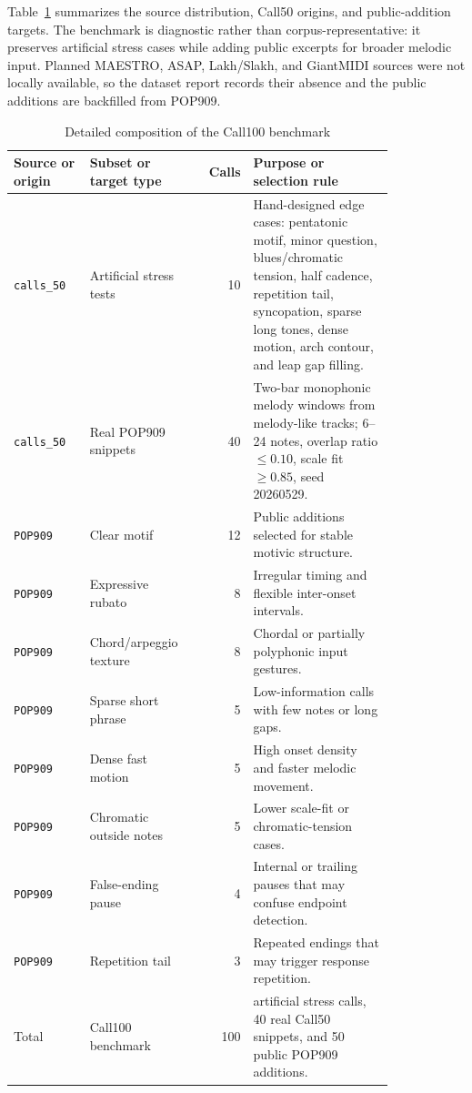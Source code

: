 \documentclass[11pt,a4paper]{article}
\begin{document}
Table~\ref{tab:call100-dataset} summarizes the source distribution, Call50 origins, and public-addition targets. The benchmark is diagnostic rather than corpus-representative: it preserves artificial stress cases while adding public excerpts for broader melodic input. Planned MAESTRO, ASAP, Lakh/Slakh, and GiantMIDI sources were not locally available, so the dataset report records their absence and the public additions are backfilled from POP909.

\begin{table}[htbp]
\centering
\caption{Detailed composition of the Call100 benchmark}
\label{tab:call100-dataset}
\small
\begin{tabular}{>{\raggedright\arraybackslash}p{0.20\linewidth}>{\raggedright\arraybackslash}p{0.26\linewidth}r>{\raggedright\arraybackslash}p{0.37\linewidth}}
\toprule
Source or origin & Subset or target type & Calls & Purpose or selection rule \\
\midrule
\texttt{calls\_50} & Artificial stress tests & 10 & Hand-designed edge cases: pentatonic motif, minor question, blues/chromatic tension, half cadence, repetition tail, syncopation, sparse long tones, dense motion, arch contour, and leap gap filling. \\
\texttt{calls\_50} & Real POP909 snippets & 40 & Two-bar monophonic melody windows from melody-like tracks; 6--24 notes, overlap ratio $\leq 0.10$, scale fit $\geq 0.85$, seed 20260529. \\
\midrule
\texttt{POP909} & Clear motif & 12 & Public additions selected for stable motivic structure. \\
\texttt{POP909} & Expressive rubato & 8 & Irregular timing and flexible inter-onset intervals. \\
\texttt{POP909} & Chord/arpeggio texture & 8 & Chordal or partially polyphonic input gestures. \\
\texttt{POP909} & Sparse short phrase & 5 & Low-information calls with few notes or long gaps. \\
\texttt{POP909} & Dense fast motion & 5 & High onset density and faster melodic movement. \\
\texttt{POP909} & Chromatic outside notes & 5 & Lower scale-fit or chromatic-tension cases. \\
\texttt{POP909} & False-ending pause & 4 & Internal or trailing pauses that may confuse endpoint detection. \\
\texttt{POP909} & Repetition tail & 3 & Repeated endings that may trigger response repetition. \\
\midrule
Total & Call100 benchmark & 100 & 10 artificial stress calls, 40 real Call50 snippets, and 50 public POP909 additions. \\
\bottomrule
\end{tabular}
\end{table}
\end{document}

